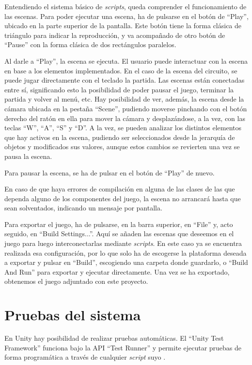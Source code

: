 Entendiendo el sistema básico de \textit{scripts}, queda comprender el funcionamiento de las escenas. Para poder ejecutar una escena, ha de pulsarse en el botón de ``Play'', ubicado en la parte superior de la pantalla. Este botón tiene la forma clásica de triángulo para indicar la reproducción, y va acompañado de otro botón de ``Pause'' con la forma clásica de dos rectángulos paralelos. 

Al darle a ``Play'', la escena se ejecuta. El usuario puede interactuar con la escena en base a los elementos implementados. En el caso de la escena del circuito, se puede jugar directamente con el teclado la partida. Las escenas están conectadas entre sí, significando esto la posibilidad de poder pausar el juego, terminar la partida y volver al menú, etc. Hay posibilidad de ver, además, la escena desde la cámara ubicada en la pestaña ``Scene'', pudiendo moverse pinchando con el botón derecho del ratón en ella para mover la cámara y desplazándose, a la vez, con las teclas ``W'', ``A'', ``S'' y ``D''. A la vez, se pueden analizar los distintos elementos que hay activos en la escena, pudiendo ser seleccionados desde la jerarquía de objetos y modificados sus valores, aunque estos cambios se revierten una vez se pausa la escena.

Para pausar la escena, se ha de pulsar en el botón de ``Play'' de nuevo.

En caso de que haya errores de compilación en alguna de las clases de las que dependa alguno de los componentes del juego, la escena no arrancará hasta que sean solventados, indicando un mensaje por pantalla.

Para exportar el juego, ha de pulsarse, en la barra superior, en ``File'' y, acto seguido, en ``Build Settings...''. Aquí se añaden las escenas que deseemos en el juego para luego interconectarlas mediante \textit{scripts}. En este caso ya se encuentra realizada esa configuración, por lo que solo ha de escogerse la plataforma deseada a exportar y pulsar en ``Build'', escogiendo una carpeta donde guardarlo, o ``Build And Run'' para exportar y ejecutar directamente. Una vez se ha exportado, obtenemos el juego adjuntado con este proyecto.

\section{Pruebas del sistema}

En Unity hay posibilidad de realizar pruebas automáticas. El ``Unity Test Framework'' funciona bajo la API ``Test Runner'' y permite ejecutar pruebas de forma programática a través de cualquier \textit{script} suyo \cite{testapi}.

